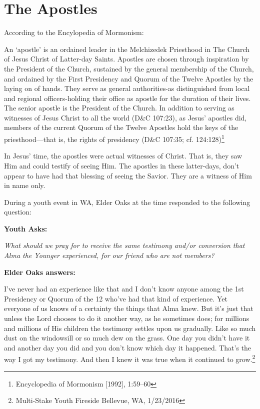 \chapter{The Apostles}

According to the Encylopedia of Mormonism:

\begin{displayquote}
An `apostle' is an ordained leader in the Melchizedek Priesthood in The Church of 
Jesus Christ of Latter-day Saints. Apostles are chosen through inspiration by the 
President of the Church, sustained by the general membership of the Church, and 
ordained by the First Presidency and Quorum of the Twelve Apostles by the laying 
on of hands. They serve as general authorities-as distinguished from local and 
regional officers-holding their office as apostle for the duration of their lives. 
The senior apostle is the President of the Church. In addition to serving as 
witnesses of Jesus Christ to all the world (D\&C 107:23), as Jesus' apostles did, 
members of the current Quorum of the Twelve Apostles hold the keys of the 
priesthood—that is, the rights of presidency (D\&C 107:35; cf. 
124:128)\footnote{Encyclopedia of Mormonism [1992], 1:59–60}
\end{displayquote}

In Jesus' time, the apostles were actual witnesses of Christ. That is, they saw Him
and could testify of seeing Him. The apostles in these latter-days, don't appear to
have had that blessing of seeing the Savior. They are a witness of Him in name only.

During a youth event in WA, Elder Oaks at the time responded to the following
question:

\begin{displayquote}
\textbf{Youth Asks:}

\textit{What should we pray for to receive the same testimony and/or conversion that 
Alma the Younger experienced, for our friend who are not members?}

\textbf{Elder Oaks answers:}

I've never had an experience like that and I don't know anyone among the 1st 
Presidency or Quorum of the 12 who've had that kind of experience. Yet everyone of 
us knows of a certainty the things that Alma knew. But it's just that unless the Lord 
chooses to do it another way, as he sometimes does; for millions and millions of His 
children the testimony settles upon us gradually. Like so much dust on the windowsill 
or so much dew on the grass. One day you didn't have it and another day you did and 
you don't know which day it happened. That's the way I got my testimony. And then I 
knew it was true when it continued to grow.\footnote{Multi-Stake Youth Fireside 
Bellevue, WA, 1/23/2016}
\end{displayquote}

